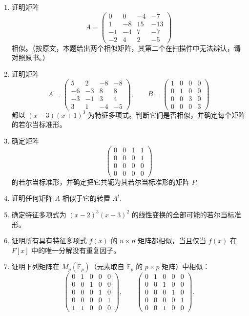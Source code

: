 \begin{enumerate}
\item 证明矩阵
\[
A = \begin{pmatrix} 0 & 0 & -4 & -7 \\ 1 & -8 & 15 & -13 \\ -1 & -4 & 7 & -7 \\ -2 & 4 & 2 & -5 \end{pmatrix}
\]
相似。（按原文，本题给出两个相似矩阵，其第二个在扫描件中无法辨认，请对照原书。）

\item 证明矩阵
\[
A = \begin{pmatrix} 5 & 2 & -8 & -8 \\ -6 & -3 & 8 & 8 \\ -3 & -1 & 3 & 4 \\ 3 & 1 & -4 & -5 \end{pmatrix}, \qquad B = \begin{pmatrix} 1 & 0 & 0 & 0 \\ 0 & 1 & 0 & 0 \\ 0 & 0 & 3 & 0 \\ 0 & 0 & 0 & 3 \end{pmatrix}
\]
都以 \((x-3)(x+1)^3\) 为特征多项式。判断它们是否相似，并确定每个矩阵的若尔当标准形。

\item 确定矩阵
\[
\begin{pmatrix} 0 & 0 & 1 & 1 \\ 0 & 0 & 0 & 1 \\ 0 & 0 & 0 & 0 \\ 0 & 0 & 0 & 0 \end{pmatrix}
\]
的若尔当标准形，并确定把它共轭为其若尔当标准形的矩阵 \(P\).

\item 证明任何矩阵 \(A\) 相似于它的转置 \(A^t\).

\item 确定特征多项式为 \((x-2)^3(x-3)^2\) 的线性变换的全部可能的若尔当标准形。

\item 证明所有具有特征多项式 \(f(x)\) 的 \(n \times n\) 矩阵都相似，当且仅当 \(f(x)\) 在 \(F[x]\) 中的唯一分解没有重复因子。

\item 证明下列矩阵在 \(M_p(\mathbb{F}_p)\)（元素取自 \(\mathbb{F}_p\) 的 \(p \times p\) 矩阵）中相似：
\[
\begin{pmatrix} 0 & 1 & 0 & 0 & 0 \\ 0 & 0 & 1 & 0 & 0 \\ 0 & 0 & 0 & 1 & 0 \\ 0 & 0 & 0 & 0 & 1 \\ 1 & 1 & 0 & 0 & 0 \end{pmatrix}, \qquad \begin{pmatrix} 0 & 1 & 0 & 0 & 0 \\ 0 & 0 & 1 & 0 & 0 \\ 0 & 0 & 0 & 1 & 0 \\ 0 & 0 & 0 & 0 & 1 \\ 0 & 0 & 1 & 0 & 0 \end{pmatrix}.
\]


\end{enumerate}
